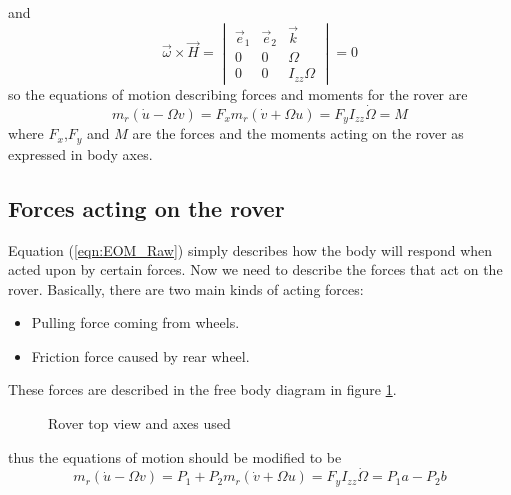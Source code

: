 \documentclass{article}
\begin{document}
	and 
	\[\vec{\omega}\times\vec{H} = \begin{vmatrix}
	\vec{e}_1 &\vec{e}_2&\vec{k}\\0& 0& \Omega\\0& 0& I_{zz}\Omega
	\end{vmatrix} =0 
	\]
	so the equations of motion describing forces and moments for the rover are
	\begin{subequations}
		\begin{equation}
		m_r\left(\dot{u} -\Omega v\right) = F_x
		\end{equation}
		\begin{equation}
		m_r\left(\dot{v} + \Omega u\right) = F_y
		\end{equation}
		\begin{equation}
		I_{zz}\dot{\Omega} = M
		\end{equation}
		\label{eqn:EOM_Raw}
	\end{subequations}
	where $F_x$,$F_y$ and $M$ are the forces and the moments acting on the rover as expressed in body axes.
	\subsection{Forces acting on the rover}
	Equation (\ref{eqn:EOM_Raw}) simply describes how the body will respond when acted upon by certain forces. Now we need to describe the forces that act on the rover. Basically, there are two main kinds of acting forces:
	\begin{itemize}
		\item Pulling force coming from wheels.
		\item Friction force caused by rear wheel.
	\end{itemize}
	These forces are described in the free body diagram in figure \ref{fig:fbd}.
	\begin{figure}[H]
		\centering
		\def\svgwidth{200pt}
		
		\caption{Rover top view and axes used}
		\label{fig:fbd}
	\end{figure}
	thus the equations of motion should be modified to be
	\begin{subequations}
		\begin{equation}
		m_r\left(\dot{u} -\Omega v\right) = P_1 + P_2
		\end{equation}
		\begin{equation}
		m_r\left(\dot{v} + \Omega u\right) = F_y
		\end{equation}
		\begin{equation}
		I_{zz}\dot{\Omega} = P_1 a - P_2 b
		\end{equation}
		\label{eqn:EOM_mod}
	\end{subequations}
\end{document}
